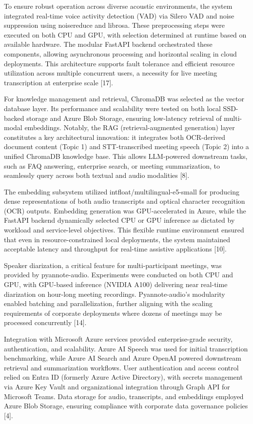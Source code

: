 \documentclass[12pt,a4paper]{article}
\begin{document}
To ensure robust operation across diverse acoustic environments, the system integrated real-time voice activity detection (VAD) via Silero VAD and noise suppression using noisereduce and librosa. These preprocessing steps were executed on both CPU and GPU, with selection determined at runtime based on available hardware. The modular FastAPI backend orchestrated these components, allowing asynchronous processing and horizontal scaling in cloud deployments. This architecture supports fault tolerance and efficient resource utilization across multiple concurrent users, a necessity for live meeting transcription at enterprise scale [17].


For knowledge management and retrieval, ChromaDB was selected as the vector database layer. Its performance and scalability were tested on both local SSD-backed storage and Azure Blob Storage, ensuring low-latency retrieval of multi-modal embeddings. Notably, the RAG (retrieval-augmented generation) layer constitutes a key architectural innovation: it integrates both OCR-derived document content (Topic 1) and STT-transcribed meeting speech (Topic 2) into a unified ChromaDB knowledge base. This allows LLM-powered downstream tasks, such as FAQ answering, enterprise search, or meeting summarization, to seamlessly query across both textual and audio modalities [8].


The embedding subsystem utilized intfloat/multilingual-e5-small for producing dense representations of both audio transcripts and optical character recognition (OCR) outputs. Embedding generation was GPU-accelerated in Azure, while the FastAPI backend dynamically selected CPU or GPU inference as dictated by workload and service-level objectives. This flexible runtime environment ensured that even in resource-constrained local deployments, the system maintained acceptable latency and throughput for real-time assistive applications [10].


Speaker diarization, a critical feature for multi-participant meetings, was provided by pyannote-audio. Experiments were conducted on both CPU and GPU, with GPU-based inference (NVIDIA A100) delivering near real-time diarization on hour-long meeting recordings. Pyannote-audio’s modularity enabled batching and parallelization, further aligning with the scaling requirements of corporate deployments where dozens of meetings may be processed concurrently [14].


Integration with Microsoft Azure services provided enterprise-grade security, authentication, and scalability. Azure AI Speech was used for initial transcription benchmarking, while Azure AI Search and Azure OpenAI powered downstream retrieval and summarization workflows. User authentication and access control relied on Entra ID (formerly Azure Active Directory), with secrets management via Azure Key Vault and organizational integration through Graph API for Microsoft Teams. Data storage for audio, transcripts, and embeddings employed Azure Blob Storage, ensuring compliance with corporate data governance policies [4].
\end{document}
